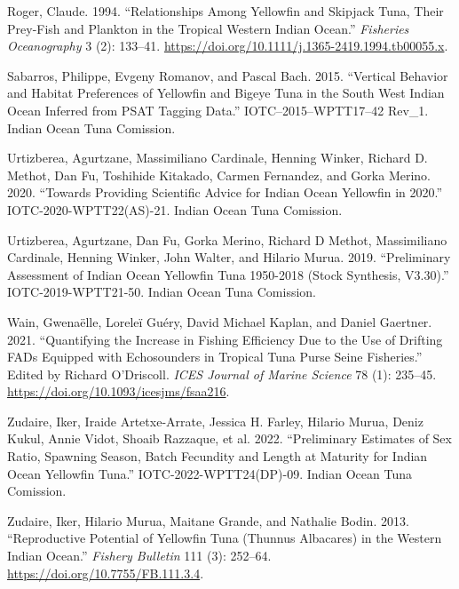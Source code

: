 \documentclass[
]{scrartcl}
\newlength{\cslhangindent}
\newenvironment{CSLReferences}[2] %
 {\begin{list}{}{%
  \setlength{\itemindent}{0pt}
  \setlength{\leftmargin}{0pt}
  \setlength{\parsep}{0pt}
  \ifodd #1
   \setlength{\leftmargin}{\cslhangindent}
   \setlength{\itemindent}{-1\cslhangindent}
  \fi
  \setlength{\itemsep}{#2\baselineskip}}}
 {\end{list}}
\begin{document}
\begin{CSLReferences}{1}{0}
Roger, Claude. 1994. {``Relationships Among Yellowfin and Skipjack Tuna,
Their Prey-Fish and Plankton in the Tropical Western {Indian Ocean}.''}
\emph{Fisheries Oceanography} 3 (2): 133--41.
\url{https://doi.org/10.1111/j.1365-2419.1994.tb00055.x}.

Sabarros, Philippe, Evgeny Romanov, and Pascal Bach. 2015. {``Vertical
Behavior and Habitat Preferences of Yellowfin and Bigeye Tuna in the
{South West Indian Ocean} Inferred from {PSAT} Tagging Data.''}
IOTC--2015--WPTT17--42 Rev\_1. Indian Ocean Tuna Comission.

Urtizberea, Agurtzane, Massimiliano Cardinale, Henning Winker, Richard
D. Methot, Dan Fu, Toshihide Kitakado, Carmen Fernandez, and Gorka
Merino. 2020. {``Towards Providing Scientific Advice for {Indian Ocean}
Yellowfin in 2020.''} IOTC-2020-WPTT22(AS)-21. Indian Ocean Tuna
Comission.

Urtizberea, Agurtzane, Dan Fu, Gorka Merino, Richard D Methot,
Massimiliano Cardinale, Henning Winker, John Walter, and Hilario Murua.
2019. {``Preliminary Assessment of {Indian Ocean} Yellowfin Tuna
1950-2018 ({Stock Synthesis}, V3.30).''} IOTC-2019-WPTT21-50. Indian
Ocean Tuna Comission.

Wain, Gwenaëlle, Loreleï Guéry, David Michael Kaplan, and Daniel
Gaertner. 2021. {``Quantifying the Increase in Fishing Efficiency Due to
the Use of Drifting {FADs} Equipped with Echosounders in Tropical Tuna
Purse Seine Fisheries.''} Edited by Richard O'Driscoll. \emph{ICES
Journal of Marine Science} 78 (1): 235--45.
\url{https://doi.org/10.1093/icesjms/fsaa216}.

Zudaire, Iker, Iraide Artetxe-Arrate, Jessica H. Farley, Hilario Murua,
Deniz Kukul, Annie Vidot, Shoaib Razzaque, et al. 2022. {``Preliminary
Estimates of Sex Ratio, Spawning Season, Batch Fecundity and Length at
Maturity for {Indian Ocean} Yellowfin Tuna.''} IOTC-2022-WPTT24(DP)-09.
Indian Ocean Tuna Comission.

Zudaire, Iker, Hilario Murua, Maitane Grande, and Nathalie Bodin. 2013.
{``Reproductive Potential of {Yellowfin Tuna} ({Thunnus} Albacares) in
the Western {Indian Ocean}.''} \emph{Fishery Bulletin} 111 (3): 252--64.
\url{https://doi.org/10.7755/FB.111.3.4}.

\end{CSLReferences}
\end{document}
